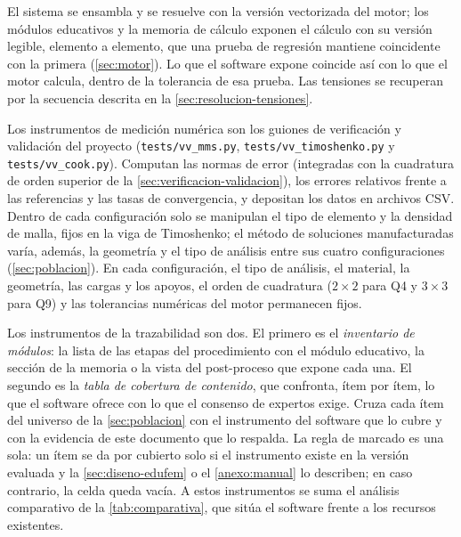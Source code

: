 El sistema se ensambla y se resuelve con la versión vectorizada del motor; los módulos educativos y la memoria de cálculo exponen el cálculo con su versión legible, elemento a elemento, que una prueba de regresión mantiene coincidente con la primera (\autoref{sec:motor}). Lo que el software expone coincide así con lo que el motor calcula, dentro de la tolerancia de esa prueba. Las tensiones se recuperan por la secuencia descrita en la \autoref{sec:resolucion-tensiones}.

Los instrumentos de medición numérica son los guiones de verificación y validación del proyecto (\texttt{tests/vv\_mms.py}, \texttt{tests/vv\_timoshenko.py} y \texttt{tests/vv\_cook.py}). Computan las normas de error (integradas con la cuadratura de orden superior de la \autoref{sec:verificacion-validacion}), los errores relativos frente a las referencias y las tasas de convergencia, y depositan los datos en archivos CSV. Dentro de cada configuración solo se manipulan el tipo de elemento y la densidad de malla, fijos en la viga de Timoshenko; el método de soluciones manufacturadas varía, además, la geometría y el tipo de análisis entre sus cuatro configuraciones (\autoref{sec:poblacion}). En cada configuración, el tipo de análisis, el material, la geometría, las cargas y los apoyos, el orden de cuadratura ($2\times2$ para Q4 y $3\times3$ para Q9) y las tolerancias numéricas del motor permanecen fijos.

Los instrumentos de la trazabilidad son dos. El primero es el \emph{inventario de módulos}: la lista de las etapas del procedimiento con el módulo educativo, la sección de la memoria o la vista del post-proceso que expone cada una. El segundo es la \emph{tabla de cobertura de contenido}, que confronta, ítem por ítem, lo que el software ofrece con lo que el consenso de expertos exige. Cruza cada ítem del universo de la \autoref{sec:poblacion} con el instrumento del software que lo cubre y con la evidencia de este documento que lo respalda. La regla de marcado es una sola: un ítem se da por cubierto solo si el instrumento existe en la versión evaluada y la \autoref{sec:diseno-edufem} o el \autoref{anexo:manual} lo describen; en caso contrario, la celda queda vacía. A estos instrumentos se suma el análisis comparativo de la \autoref{tab:comparativa}, que sitúa el software frente a los recursos existentes.

